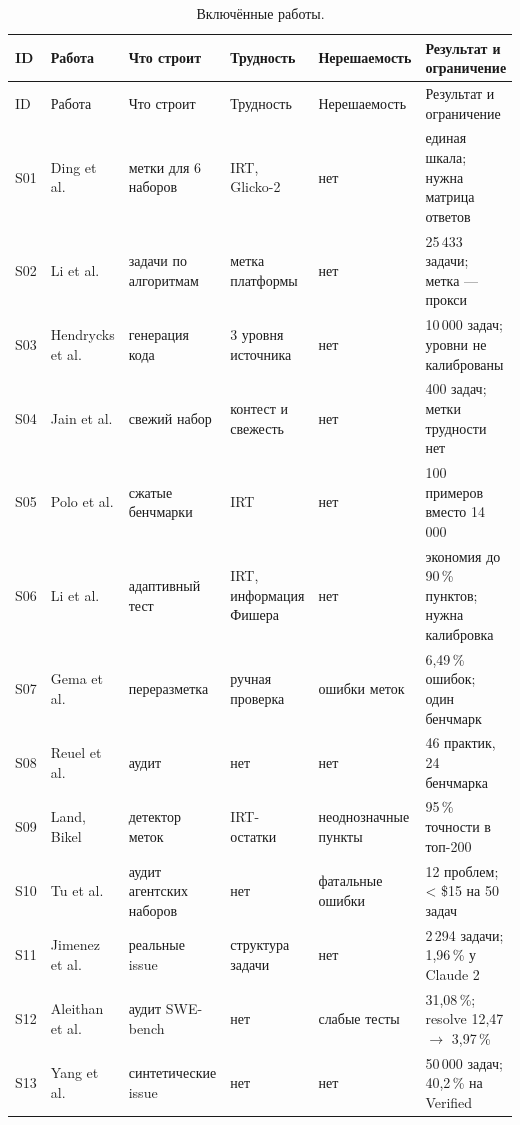 \documentclass[11pt,a4paper]{article}
\begin{document}
{\footnotesize
\setlength{\tabcolsep}{3pt}
\renewcommand{\arraystretch}{1.12}
\begin{longtable}{@{}p{0.65cm}p{2.6cm}p{2.6cm}p{2.9cm}p{2.9cm}p{2.7cm}@{}}
\caption{Включённые работы.}\label{tab:sources}\\
\toprule
ID & Работа & Что строит & Трудность & Нерешаемость & Результат и ограничение \\
\midrule
\endfirsthead
\toprule
ID & Работа & Что строит & Трудность & Нерешаемость & Результат и ограничение \\
\midrule
\endhead
\bottomrule
\endfoot

S01 & Ding et al. \cite{easy2hard2024} & метки для 6 наборов & IRT, Glicko-2 & нет & единая шкала; нужна матрица ответов \\
S02 & Li et al. \cite{taco2023} & задачи по алгоритмам & метка платформы & нет & 25\,433 задачи; метка — прокси \\
S03 & Hendrycks et al. \cite{apps2021} & генерация кода & 3 уровня источника & нет & 10\,000 задач; уровни не калиброваны \\
S04 & Jain et al. \cite{livecodebench2024} & свежий набор & контест и свежесть & нет & 400 задач; метки трудности нет \\
S05 & Polo et al. \cite{tinybenchmarks2024} & сжатые бенчмарки & IRT & нет & 100 примеров вместо 14\,000 \\
S06 & Li et al. \cite{atlas2025} & адаптивный тест & IRT, информация Фишера & нет & экономия до 90\,\% пунктов; нужна калибровка \\
S07 & Gema et al. \cite{mmlu_redux2024} & переразметка & ручная проверка & ошибки меток & 6{,}49\,\% ошибок; один бенчмарк \\
S08 & Reuel et al. \cite{betterbench2024} & аудит & нет & нет & 46 практик, 24 бенчмарка \\
S09 & Land, Bikel \cite{audit_irt2026} & детектор меток & IRT-остатки & неоднозначные пункты & 95\,\% точности в топ-200 \\
S10 & Tu et al. \cite{whoguards2026} & аудит агентских наборов & нет & фатальные ошибки & 12 проблем; < \$15 на 50 задач \\
S11 & Jimenez et al. \cite{swebench2023} & реальные issue & структура задачи & нет & 2\,294 задачи; 1{,}96\,\% у Claude 2 \\
S12 & Aleithan et al. \cite{swebenchplus2024} & аудит SWE-bench & нет & слабые тесты & 31{,}08\,\%; resolve 12{,}47 $\to$ 3{,}97\,\% \\
S13 & Yang et al. \cite{swesmith2025} & синтетические issue & нет & нет & 50\,000 задач; 40{,}2\,\% на Verified \\

\end{longtable}}
\end{document}
